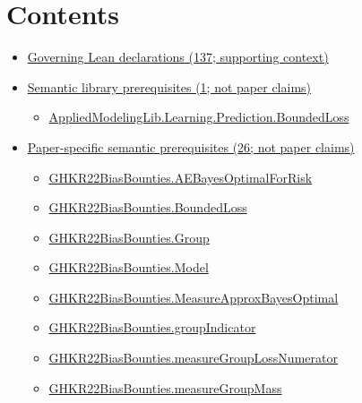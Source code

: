 \documentclass[10pt]{article}
\begin{document}
\section*{Contents}
\begin{itemize}[leftmargin=1.2em]
\item \hyperlink{governing-declaration-section-5ef5ef0364b6939c}{Governing Lean declarations (137; supporting context)}
\item \hyperlink{library-section-5573d0c431c68f22}{Semantic library prerequisites (1; not paper claims)}
\begin{itemize}[leftmargin=1.2em]
\item \hyperlink{library-prerequisite-ce7caeacc1d4c7d3}{Applied\allowbreak{}Modeling\allowbreak{}Lib.\allowbreak{}Learning.\allowbreak{}Prediction.\allowbreak{}Bounded\allowbreak{}Loss}
\end{itemize}
\item \hyperlink{paper-prerequisite-section-5ef5ef0364b6939c}{Paper-specific semantic prerequisites (26; not paper claims)}
\begin{itemize}[leftmargin=1.2em]
\item \hyperlink{paper-prerequisite-385de6a27594409d}{GHKR22\allowbreak{}Bias\allowbreak{}Bounties.\allowbreak{}AE\allowbreak{}Bayes\allowbreak{}Optimal\allowbreak{}For\allowbreak{}Risk}
\item \hyperlink{paper-prerequisite-ef6c319b0770dad4}{GHKR22\allowbreak{}Bias\allowbreak{}Bounties.\allowbreak{}Bounded\allowbreak{}Loss}
\item \hyperlink{paper-prerequisite-cc7214115b27106f}{GHKR22\allowbreak{}Bias\allowbreak{}Bounties.\allowbreak{}Group}
\item \hyperlink{paper-prerequisite-333127605c12eba8}{GHKR22\allowbreak{}Bias\allowbreak{}Bounties.\allowbreak{}Model}
\item \hyperlink{paper-prerequisite-7ae84fcf376c9f20}{GHKR22\allowbreak{}Bias\allowbreak{}Bounties.\allowbreak{}Measure\allowbreak{}Approx\allowbreak{}Bayes\allowbreak{}Optimal}
\item \hyperlink{paper-prerequisite-47614821994b2ed9}{GHKR22\allowbreak{}Bias\allowbreak{}Bounties.\allowbreak{}group\allowbreak{}Indicator}
\item \hyperlink{paper-prerequisite-b4c6e5e84964ca52}{GHKR22\allowbreak{}Bias\allowbreak{}Bounties.\allowbreak{}measure\allowbreak{}Group\allowbreak{}Loss\allowbreak{}Numerator}
\item \hyperlink{paper-prerequisite-ac1a5a161f2dd3f6}{GHKR22\allowbreak{}Bias\allowbreak{}Bounties.\allowbreak{}measure\allowbreak{}Group\allowbreak{}Mass}

\end{itemize}
\end{itemize}
\end{document}
